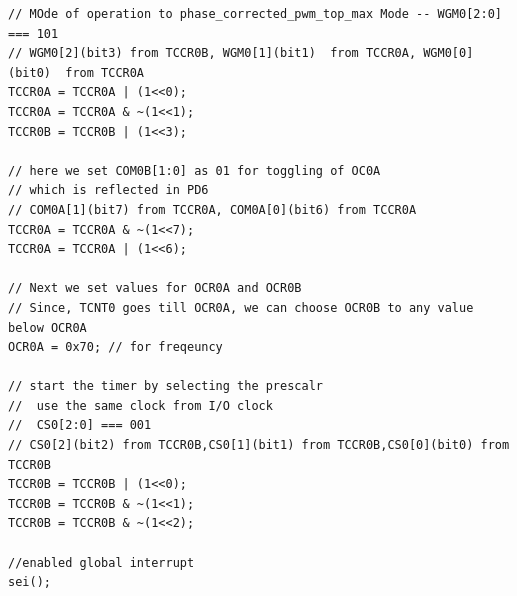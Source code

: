\documentclass{article}
\begin{document}
\begin{verbatim}
// MOde of operation to phase_corrected_pwm_top_max Mode -- WGM0[2:0] === 101
// WGM0[2](bit3) from TCCR0B, WGM0[1](bit1)  from TCCR0A, WGM0[0](bit0)  from TCCR0A
TCCR0A = TCCR0A | (1<<0);
TCCR0A = TCCR0A & ~(1<<1);
TCCR0B = TCCR0B | (1<<3);	

// here we set COM0B[1:0] as 01 for toggling of OC0A
// which is reflected in PD6
// COM0A[1](bit7) from TCCR0A, COM0A[0](bit6) from TCCR0A
TCCR0A = TCCR0A & ~(1<<7);
TCCR0A = TCCR0A | (1<<6);

// Next we set values for OCR0A and OCR0B
// Since, TCNT0 goes till OCR0A, we can choose OCR0B to any value below OCR0A
OCR0A = 0x70; // for freqeuncy

// start the timer by selecting the prescalr
//  use the same clock from I/O clock
//  CS0[2:0] === 001
// CS0[2](bit2) from TCCR0B,CS0[1](bit1) from TCCR0B,CS0[0](bit0) from TCCR0B
TCCR0B = TCCR0B | (1<<0);
TCCR0B = TCCR0B & ~(1<<1);
TCCR0B = TCCR0B & ~(1<<2);

//enabled global interrupt
sei();
\end{verbatim}
\end{document}
